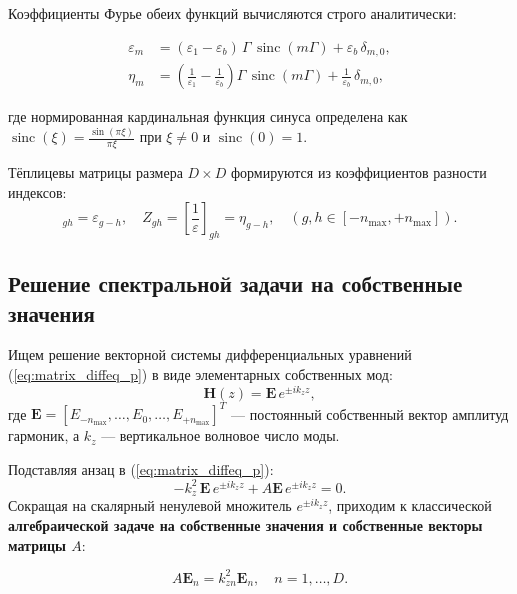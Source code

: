 \documentclass[a4paper,11pt]{article}
\begin{document}
Коэффициенты Фурье обеих функций вычисляются строго аналитически:
\begin{mathbox}
\begin{align}
    \varepsilon_m &= (\varepsilon_1 - \varepsilon_b) \, \Gamma \, \operatorname{sinc}(m \Gamma) + \varepsilon_b \, \delta_{m, 0}, \label{eq:fourier_eps} \\[0.5em]
    \eta_m &= \left( \frac{1}{\varepsilon_1} - \frac{1}{\varepsilon_b} \right) \Gamma \, \operatorname{sinc}(m \Gamma) + \frac{1}{\varepsilon_b} \, \delta_{m, 0}, \label{eq:fourier_eta}
\end{align}
\end{mathbox}
где нормированная кардинальная функция синуса определена как $\operatorname{sinc}(\xi) = \frac{\sin(\pi \xi)}{\pi \xi}$ при $\xi \ne 0$ и $\operatorname{sinc}(0) = 1$.

Тёплицевы матрицы размера $D \times D$ формируются из коэффициентов разности индексов:
\begin{equation}
    [\varepsilon]_{gh} = \varepsilon_{g - h}, \quad Z_{gh} = \left[\frac{1}{\varepsilon}\right]_{gh} = \eta_{g - h}, \quad (g, h \in [-n_{\max}, +n_{\max}]).
\end{equation}

\subsection{Решение спектральной задачи на собственные значения}

Ищем решение векторной системы дифференциальных уравнений (\ref{eq:matrix_diffeq_p}) в виде элементарных собственных мод:
\begin{equation}
    \mathbf{H}(z) = \mathbf{E} \, e^{\pm i k_z z},
\end{equation}
где $\mathbf{E} = [E_{-n_{\max}}, \dots, E_0, \dots, E_{+n_{\max}}]^T$ — постоянный собственный вектор амплитуд гармоник, а $k_z$ — вертикальное волновое число моды.

Подставляя анзац в (\ref{eq:matrix_diffeq_p}):
\begin{equation}
    -k_z^2 \, \mathbf{E} \, e^{\pm i k_z z} + A \mathbf{E} \, e^{\pm i k_z z} = 0.
\end{equation}
Сокращая на скалярный ненулевой множитель $e^{\pm i k_z z}$, приходим к классической \textbf{алгебраической задаче на собственные значения и собственные векторы матрицы $A$}:

\begin{mathbox}
\begin{equation}
    A \mathbf{E}_n = k_{zn}^2 \mathbf{E}_n, \quad n = 1, \dots, D.
    \label{eq:eigenvalue_p}
\end{equation}
\end{mathbox}
\end{document}

